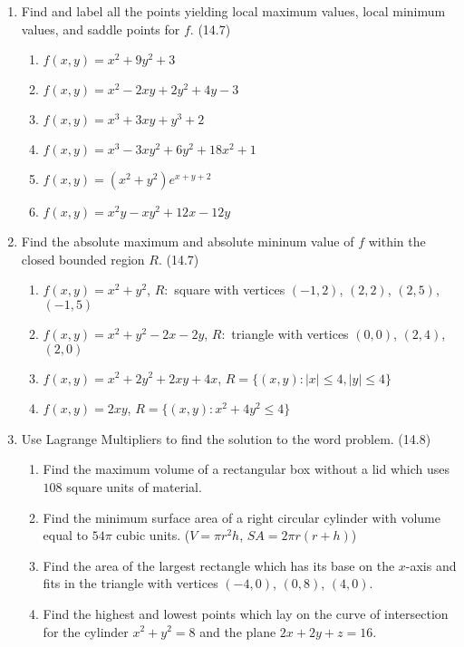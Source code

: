 \begin{enumerate}
    \newpage

    \item Find and label all the points yielding local maximum values, local minimum values, and saddle points for $f$. (14.7)

      \begin{enumerate}
        \item $f(x,y)=x^2+9y^2+3$
        \item $f(x,y)=x^2-2xy+2y^2+4y-3$
        \item $f(x,y)=x^3+3xy+y^3+2$
        \item $f(x,y)=x^3-3xy^2+6y^2+18x^2+1$ %
        \item $f(x,y)=(x^2+y^2)e^{x+y+2}$
        \item $f(x,y)=x^2y-xy^2+12x-12y$
      \end{enumerate}

    \item Find the absolute maximum and absolute mininum value of $f$ within the closed bounded region $R$. (14.7)

      \begin{enumerate}
        \item $f(x,y)=x^2+y^2$, $R:$ square with vertices $(-1,2)$, $(2,2)$, $(2,5)$, $(-1,5)$
        \item $f(x,y)=x^2+y^2-2x-2y$, $R:$ triangle with vertices $(0,0)$, $(2,4)$, $(2,0)$
        \item $f(x,y)=x^2+2y^2+2xy+4x$, $R = \{(x,y):|x|\leq4,|y|\leq4\}$
        \item $f(x,y)=2xy$, $R = \{(x,y):x^2+4y^2\leq 4\}$
      \end{enumerate}

    \item Use Lagrange Multipliers to find the solution to the word problem. (14.8)

      \begin{enumerate}
        \item Find the maximum volume of a rectangular box without a lid which uses $108$ square units of material.
        \item Find the minimum surface area of a right circular cylinder with volume equal to $54\pi$ cubic units. ($V=\pi r^2h$, $SA=2\pi r(r+h)$)
        \item Find the area of the largest rectangle which has its base on the $x$-axis and fits in the triangle with vertices $(-4,0)$, $(0,8)$, $(4,0)$.
        \item Find the highest and lowest points which lay on the curve of intersection for the cylinder $x^2+y^2=8$ and the plane $2x+2y+z=16$.
      \end{enumerate}


\end{enumerate}
